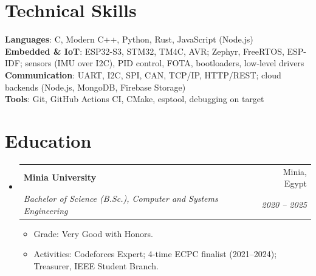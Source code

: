 \documentclass[letterpaper,11pt]{article}
\makeatletter
\newcommand{\resumeItem}[1]{
  \item\small{
    {#1 \vspace{-2pt}}
  }
}
\newcommand{\resumeSubheading}[4]{
  \vspace{-2pt}\item
    \begin{tabular*}{0.97\textwidth}[t]{l@{\extracolsep{\fill}}r}
      \textbf{#1} & #2 \\
      \textit{\small#3} & \textit{\small #4} \\
    \end{tabular*}\vspace{-7pt}
}
\newcommand{\resumeSubHeadingListStart}{\begin{itemize}[leftmargin=0.15in, label={}]}
\newcommand{\resumeSubHeadingListEnd}{\end{itemize}}
\newcommand{\resumeItemListStart}{\begin{itemize}}
\newcommand{\resumeItemListEnd}{\end{itemize}\vspace{-5pt}}
\makeatother
\begin{document}
\section{Technical Skills}
 \begin{itemize}[leftmargin=0.15in, label={}]
    \small{\item{
     \textbf{Languages}{: C, Modern C++, Python, Rust, JavaScript (Node.js)} \\
     \textbf{Embedded \& IoT}{: ESP32-S3, STM32, TM4C, AVR; Zephyr, FreeRTOS, ESP-IDF; sensors (IMU over I2C), PID control, FOTA, bootloaders, low-level drivers} \\
     \textbf{Communication}{: UART, I2C, SPI, CAN, TCP/IP, HTTP/REST; cloud backends (Node.js, MongoDB, Firebase Storage)} \\
     \textbf{Tools}{: Git, GitHub Actions CI, CMake, esptool, debugging on target}
    }}
 \end{itemize}

\section{Education}
  \resumeSubHeadingListStart
    \resumeSubheading
      {Minia University}{Minia, Egypt}
      {Bachelor of Science (B.Sc.), Computer and Systems Engineering}{2020 -- 2025}
      \resumeItemListStart
        \resumeItem{Grade: Very Good with Honors.}
        \resumeItem{Activities: Codeforces Expert; 4-time ECPC finalist (2021--2024); Treasurer, IEEE Student Branch.}
      \resumeItemListEnd
  \resumeSubHeadingListEnd


\end{document}
